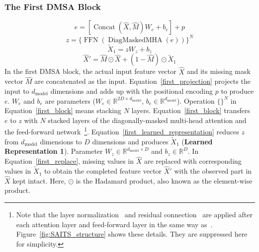 \documentclass{article}
\begin{document}
\subsubsection{The First DMSA Block} \label{SAITS: the 1st block}
\begin{equation} \label{first_projection}
	e = \left[\operatorname{Concat}\left(\hat{X}, \hat{M}\right) W_e + b_e\right] + p
\end{equation}
\begin{equation} \label{first_block}
	z = \{\operatorname{FFN}(\operatorname{DiagMaskedMHA}\left(e\right))\}^N
\end{equation}
\begin{equation} \label{first_learned_representation}
	\tilde{X}_1 = z W_z + b_z 
\end{equation}
\begin{equation} \label{first_replace}
	\hat{X}' = \hat{M}\odot \hat{X} + \left(1 - \hat{M}\right)\odot \tilde{X}_1
\end{equation} 
In the first DMSA block, the actual input feature vector $\hat{X}$ and its missing mask vector $\hat{M}$ are concatenated as the input. Equation~\ref{first_projection} projects the input to $d_{\text{model}}$ dimensions and adds up with the positional encoding $p$ to produce $e$. $W_e$ and $b_e$ are parameters ($W_e \in \mathbb{R}^{2D \times d_{\text{model}}}$, $b_e \in \mathbb{R}^{d_{\text{model}}}$). Operation $\{\}^N$ in Equation~\ref{first_block} means stacking $N$ layers. Equation~\ref{first_block} transfers $e$ to $z$ with $N$ stacked layers of the diagonally-masked multi-head attention and the feed-forward network~\footnote{Note that the layer normalization~\cite{Ba2016LN} and residual connection~\cite{He2016ResNet} are applied after each attention layer and feed-forward layer in the same way as~\cite{Vaswani2017SelfAttention}. Figure~\ref{fig:SAITS_structure} shows these details. They are suppressed here for simplicity.}. Equation~\ref{first_learned_representation} reduces $z$ from $d_\text{model}$ dimensions to $D$ dimensions and produces $\tilde{X}_1$ (\textbf{Learned Representation 1}). Parameter $W_z \in \mathbb{R}^{d_{\text{model}} \times D}$ and $b_z \in \mathbb{R}^{D}$. In Equation~\ref{first_replace}, missing values in $\hat{X}$ are replaced with corresponding values in $\tilde{X}_1$ to obtain the completed feature vector $\hat{X}'$ with the observed part in $\hat{X}$ kept intact. Here, $\odot$ is the Hadamard product, also known as the element-wise product.
\end{document}
